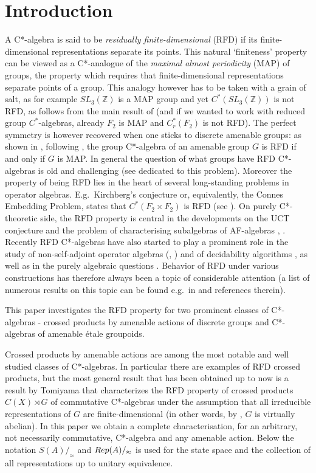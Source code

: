 \documentclass[11 pt, leqno, hidelinks]{amsart}%
\theoremstyle{plain}
\numberwithin{equation}{section}
\newcommand{\Z}{\mathbb{Z}}
\newcommand{\Rep}{\textup{Rep}}
\begin{document}
\section{Introduction}
A C*-algebra is said to be {\it residually finite-dimensional} (RFD) if its finite-dimensional representations separate its points. This natural `finiteness' property can be viewed as a C*-analogue of the \emph{maximal almost periodicity} (MAP) of groups, the property which requires that finite-dimensional representations separate points of a group. This analogy however has to  be taken with a grain of salt, as for example $SL_3(\Z)$ is a MAP group and yet $C^*(SL_3(\Z))$ is not RFD, as follows from the main result of \cite{BekkaInv} (and if we wanted to work with reduced group $C^*$-algebras, already $F_2$ is MAP and $C^*_r(F_2)$ is not RFD). The perfect symmetry is however recovered when one sticks to discrete amenable groups: as shown in \cite{BekkaLouvet}, following \cite{BekkaForum}, the group C*-algebra of an amenable group $G$ is RFD if and only if $G$ is MAP.
In general the question of what groups have RFD C*-algebras is old and challenging (see \cite[Chapter 9]{LZ} dedicated to this problem). Moreover
the property of being RFD lies in the heart of several long-standing problems in operator algebras. E.g.\ Kirchberg's conjecture or,  equivalently, the Connes Embedding Problem, states that $C^*(F_2\times F_2)$ is RFD (see \cite{Taka}). On purely C*-theoretic side,  the RFD property is central in the developments on the UCT conjecture \cite{Dadarlat1} and the problem of characterising subalgebras of AF-algebras \cite{Dadarlat2}, \cite{BO}.
 Recently RFD C*-algebras have also started to play a prominent role in the study of non-self-adjoint operator algebras (\cite{CDO}, \cite{Hartz}) and of decidability algorithms  \cite{FNT}, as well as in the purely algebraic questions \cite{ANT}.  Behavior of RFD under various constructions has  therefore always been a topic of considerable attention (a list of numerous results on this topic  can be found e.g.\ in \cite{Tatiana} and references therein).

This paper investigates the RFD property for two prominent classes of C*-algebras - crossed products by amenable actions of discrete groups  and C*-algebras of amenable \'etale groupoids.

Crossed products by amenable actions are among the most notable and well studied classes of C*-algebras.   In particular there are examples of RFD crossed products, but the most general result that has been obtained up to now is a result by Tomiyama  \cite{TomiyamaBook} that characterizes the RFD property of crossed products $C(X)\rtimes G$ of commutative C*-algebras    under the assumption that all irreducible representations of $G$ are finite-dimensional (in other words, by \cite{Thoma}, $G$ is virtually abelian).  In this paper we obtain a complete characterisation, for an arbitrary, not necessarily commutative, C*-algebra and any amenable action.  Below the notation $S(A)/_\approx$ and $\Rep(A)/_\approx$ is used for the state space and the collection of  all representations up to unitary equivalence.
\end{document}
